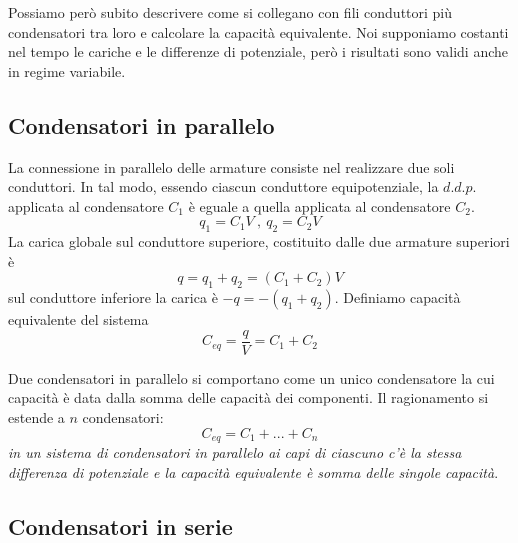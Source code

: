 \documentclass[class=book, crop=false, oneside, 12pt]{standalone}
\begin{document}
Possiamo però subito descrivere come si collegano con fili conduttori più condensatori tra loro e calcolare la capacità equivalente. 
Noi supponiamo costanti nel tempo le cariche e le differenze di potenziale, però i risultati sono validi anche in regime variabile.

\subsection{Condensatori in parallelo}

La connessione in parallelo delle armature consiste nel realizzare due soli conduttori. 
In tal modo, essendo ciascun conduttore equipotenziale, la \(d.d.p.\) applicata al condensatore \(C_1\) è eguale a quella applicata al condensatore \(C_2\).
\begin{equation*}
    q_1 = C_1 V \ , \ q_2 = C_2 V
\end{equation*}
La carica globale sul conduttore superiore, costituito dalle due armature superiori è
\begin{equation*}
    q = q_1 + q_2 = \left(C_1 + C_2 \right)V
\end{equation*}
sul conduttore inferiore la carica è \(-q = -( q_1 + q_2)\). Definiamo capacità equivalente del sistema
\begin{equation}
    C_{eq} = \frac{q}{V} = C_1 + C_2
\end{equation} 

Due condensatori in parallelo si comportano come un unico condensatore la cui capacità è data dalla somma delle capacità dei componenti. 
Il ragionamento si estende a \(n\) condensatori:
\begin{equation*}
    C_{eq} = C_1 + ... + C_n
\end{equation*}
\emph{in un sistema di condensatori in parallelo ai capi di ciascuno c'è la stessa differenza di potenziale e la capacità equivalente è somma delle singole capacità}.

\subsection{Condensatori in serie}
\end{document}

